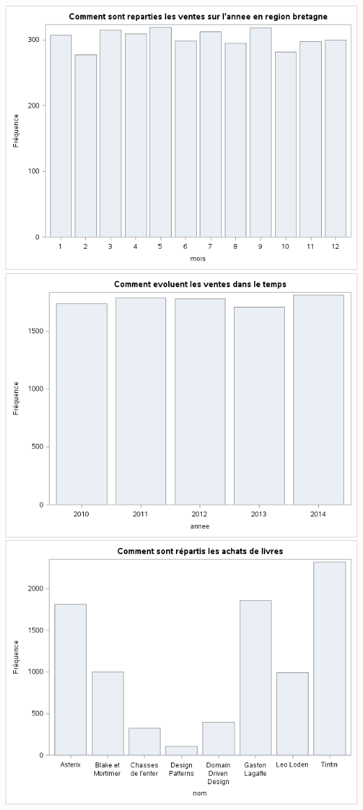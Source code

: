 \includegraphics[scale=0.7]{./images/sas_report/sas_report_3.png}
\includegraphics[scale=0.7]{./images/sas_report/sas_report_4.png}
\includegraphics[scale=0.7]{./images/sas_report/sas_report_5.png}

